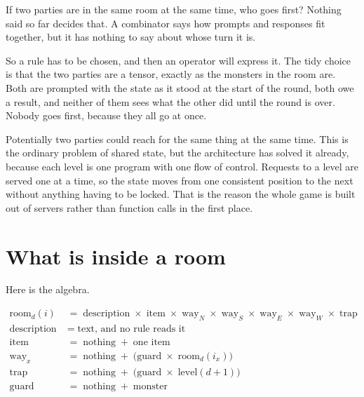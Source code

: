 \documentclass[11pt,a4paper]{article}
\begin{document}
If two parties are in the same room at the same time, who goes first? Nothing said so far decides
that. A combinator says how prompts and responses fit together, but it has nothing to say about
whose turn it is.

So a rule has to be chosen, and then an operator will express it. The tidy choice is that the two
parties are a tensor, exactly as the monsters in the room are. Both are prompted with the state
as it stood at the start of the round, both owe a result, and neither of them sees what the other
did until the round is over. Nobody goes first, because they all go at once.

Potentially two parties could reach for the same thing at the same time. This is the ordinary
problem of shared state, but the architecture has solved it already, because each level is one
program with one flow of control. Requests to a level are served one at a time, so the state moves from one
consistent position to the next without anything having to be locked. That is the reason the
whole game is built out of servers rather than function calls in the first place.

\newpage

\section{What is inside a room}
\label{sec:inroom}

Here is the algebra.

\begin{center}
\begin{tcolorbox}[plainbg, colback=pale, width=0.9\textwidth]
\begin{align*}
\text{room}_d(i) \;&=\; \text{description} \;\times\; \text{item} \;\times\;
   \text{way}_N \;\times\; \text{way}_S \;\times\; \text{way}_E \;\times\; \text{way}_W
   \;\times\; \text{trap} \\
\text{description} \;&=\; \text{text, and no rule reads it} \\
\text{item}        \;&=\; \text{nothing} \;+\; \text{one item} \\
\text{way}_x       \;&=\; \text{nothing} \;+\; \bigl( \text{guard} \;\times\; \text{room}_d(i_x) \bigr) \\
\text{trap}        \;&=\; \text{nothing} \;+\; \bigl( \text{guard} \;\times\; \text{level}(d{+}1) \bigr) \\
\text{guard}       \;&=\; \text{nothing} \;+\; \text{monster}
\end{align*}
\end{tcolorbox}
\end{center}
\end{document}
